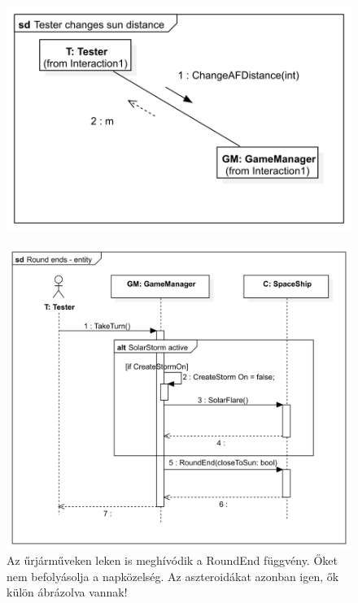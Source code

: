 \begin{figure}[H] 
\centering 
\includegraphics[width=1\textwidth]{docs/img/svg/Skeleton!Move asteroid field!Collaboration1!Interaction1!Tester changes sun distance_38.png} 
\end{figure} 

\begin{figure}[H] 
\centering 
\includegraphics[width=1\textwidth]{docs/img/svg/Skeleton!Move asteroid field!Interaction2!Round ends - entity_37.png} 
\caption{Az űrjárműveken leken is meghívódik a RoundEnd függvény. Őket nem befolyásolja a napközelség.
Az aszteroidákat azonban igen, ők külön ábrázolva vannak!} 
\end{figure} 

